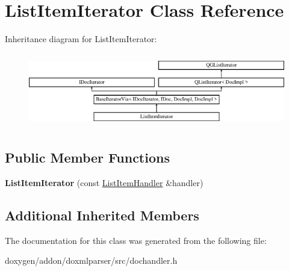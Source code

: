 \hypertarget{class_list_item_iterator}{}\section{List\+Item\+Iterator Class Reference}
\label{class_list_item_iterator}
Inheritance diagram for List\+Item\+Iterator\+:\begin{figure}[H]
\begin{center}
\leavevmode
\includegraphics[height=3.294118cm]{class_list_item_iterator}
\end{center}
\end{figure}
\subsection*{Public Member Functions}
\begin{DoxyCompactItemize}
\item 
\mbox{\label{class_list_item_iterator_ae0cbbd2e27f4ecb0c67466d2aff84e9d}} 
{\bfseries List\+Item\+Iterator} (const \mbox{\hyperlink{class_list_item_handler}{List\+Item\+Handler}} \&handler)
\end{DoxyCompactItemize}
\subsection*{Additional Inherited Members}


The documentation for this class was generated from the following file\+:\begin{DoxyCompactItemize}
\item 
doxygen/addon/doxmlparser/src/dochandler.\+h\end{DoxyCompactItemize}
